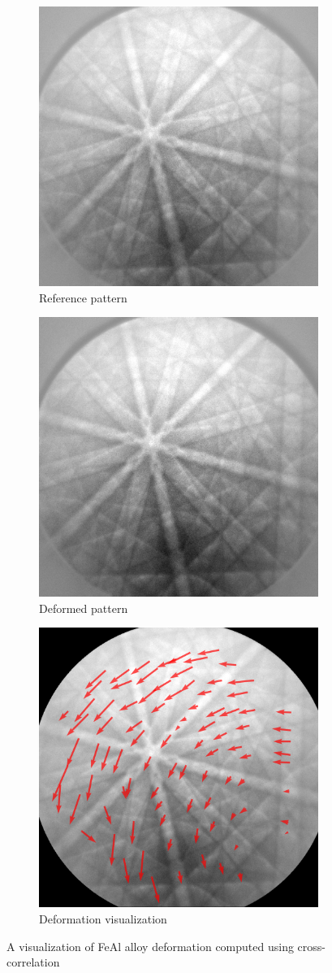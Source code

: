 \begin{figure}[h]
	\centering
	\begin{subfigure}{.33\textwidth}
		\centering
		\includegraphics[width=.6\linewidth]{img/roi_shifts_initial}
		\caption{Reference pattern}
		\label{roi-shifts:initial}
	\end{subfigure}%
	\begin{subfigure}{.33\textwidth}
		\centering
		\includegraphics[width=.6\linewidth]{img/DEFORMED_x3600y6235}
		\caption{Deformed pattern}
		\label{roi-shifts:deformed}
	\end{subfigure}
	\begin{subfigure}{.33\textwidth}
		\centering
		\includegraphics[width=.6\linewidth]{img/roi_shifts}
		\caption{Deformation visualization}
		\label{roi-shifts:result}
	\end{subfigure}

	\caption{A visualization of FeAl alloy deformation computed using cross-correlation}
	\label{roi-shifts}
\end{figure}

